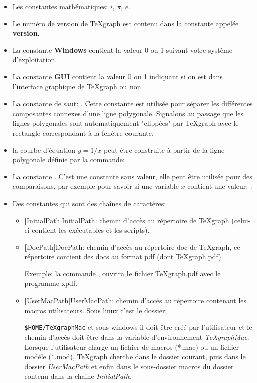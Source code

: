 \begin{itemize}
\item Les constantes mathématiques: $i$, $\pi$, $e$.

\item Le numéro de version de TeXgraph est contenu dans la constante appelée \textbf{version}.

\item La constante \textbf{Windows} contient la valeur 0 ou 1 suivant votre système d'exploitation.

\item La constante \textbf{GUI} contient la valeur 0 ou 1 indiquant si on est dans l'interface graphique de TeXgraph ou non.

\item La constante de saut: \jump{}. Cette constante est utilisée pour séparer les différentes composantes connexes d'une ligne polygonale. Signalons au passage que les lignes polygonales sont automatiquement "clippées" par TeXgraph avec le rectangle correspondant à la fenêtre courante.
\item \exem la courbe d'équation $y=1/x$ peut être construite à partir de la ligne polygonale définie par la commande: .

\item La constante \Nil. C'est une constante sans valeur, elle peut être utilisée pour des comparaisons, par exemple pour savoir si une variable $x$ contient une valeur: . 

\item Des constantes qui sont des chaînes de caractères:
        \begin{itemize}
    \item \textbf[InitialPath]{InitialPath}: chemin d'accès au répertoire de TeXgraph (celui-ci contient les exécutables et les scripts).

    \item \textbf[DocPath]{DocPath}: chemin d'accès au répertoire doc de TeXgraph, ce répertoire contient des docs au format pdf (dont TeXgraph.pdf).

Exemple: la commande , ouvrira le fichier TeXgraph.pdf avec le programme xpdf.

    \item \textbf[UserMacPath]{UserMacPath}: chemin d'accès au répertoire contenant les macros utilisateurs. Sous linux c'est le dossier;\par \verb|$HOME/TeXgraphMac| et sous windows il doit être créé par l'utilisateur et le chemin d'accès doit être dans la variable d'environnement \textit{TeXgraphMac}. Lorsque l'utilisateur charge un fichier de macros (*.mac) ou un fichier modèle (*.mod), TeXgraph cherche dans le dossier courant, puis dans le dossier \textit{UserMacPath} et enfin dans le sous-dossier macros du dossier contenu dans la chaine \textit{InitialPath}.


\end{itemize}
\end{itemize}
